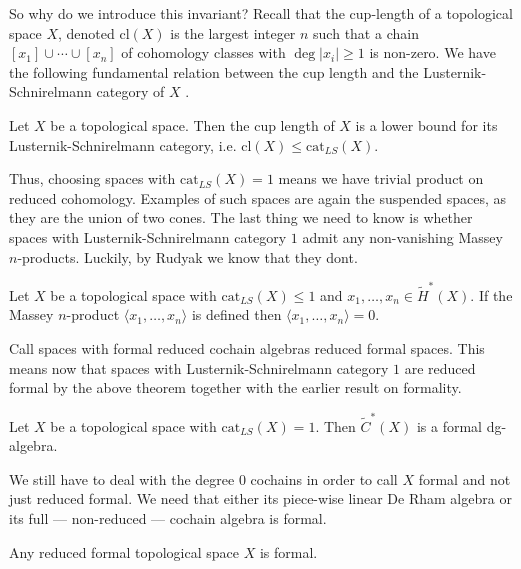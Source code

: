 So why do we introduce this invariant? Recall that the cup-length of a topological space 
$X$, denoted $\text{cl}(X)$ is the largest integer $n$ such that a chain 
$[x_1]\cup \cdots \cup [x_n]$ of cohomology classes with $\deg|x_i|\geq 1$ is non-zero. 
We have the following fundamental relation between the cup length and the 
Lusternik-Schnirelmann category of $X$ \cite{lscategorybook}.

\begin{lemma}
    Let $X$ be a topological space. Then the cup length of $X$ is a lower bound for its 
    Lusternik-Schnirelmann category, i.e. $\text{cl}(X)\leq \text{cat}_{LS}(X)$.    
\end{lemma}

Thus, choosing spaces with $\text{cat}_{LS}(X) = 1$ means we have trivial product on 
reduced cohomology. Examples of such spaces are again the suspended spaces, as they are 
the union of two cones. The last thing we need to know is whether spaces with 
Lusternik-Schnirelmann category $1$ admit any non-vanishing Massey  $n$-products. Luckily, 
by Rudyak we know that they dont.

\begin{theorem}
    Let $X$ be a topological space with $\text{cat}_{LS}(X)\leq 1$ and 
    $x_1, \ldots, x_n \in \widetilde{H}^\ast(X)$. If the Massey $n$-product 
    $\langle x_1, \ldots, x_n\rangle$ is defined then 
    $\langle x_1, \ldots, x_n\rangle = 0$.    
\end{theorem}

Call spaces with formal reduced cochain algebras reduced formal spaces. This means now
that spaces with Lusternik-Schnirelmann category $1$ are reduced formal by the above 
theorem together with the earlier result on formality. 

\begin{corollary}
    Let $X$ be a topological space with $\text{cat}_{LS}(X)=1$. Then 
    $\widetilde{C}^\ast(X)$ is a formal dg-algebra. 
\end{corollary}

We still have to deal with the degree $0$ cochains in order to call 
$X$ formal and not just reduced formal. We need that either its piece-wise linear De Rham 
algebra or its full — non-reduced — cochain algebra is formal. 

\begin{theorem}
    Any reduced formal topological space $X$ is formal.     
\end{theorem}

